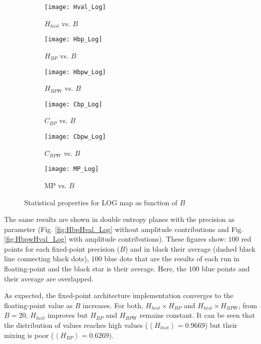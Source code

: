 \begin{figure}[htpb]
	\centering
	\begin{subfigure}[b]{0.49\textwidth}
		\texttt{[image: Hval\_Log]}
		\caption{$H_{hist}$ vs. $B$}
		\label{fig:Hval_Log}
	\end{subfigure}
	\begin{subfigure}[b]{0.49\textwidth}
		\texttt{[image: Hbp\_Log]}
		\caption{$H_{BP}$ vs. $B$}
		\label{fig:Hbp_Log}
	\end{subfigure}
	\begin{subfigure}[b]{0.49\textwidth}
		\texttt{[image: Hbpw\_Log]}
		\caption{$H_{BPW}$ vs. $B$}
		\label{fig:Hbpw_Log}
	\end{subfigure}
	\begin{subfigure}[b]{0.49\textwidth}
		\texttt{[image: Cbp\_Log]}
		\caption{$C_{BP}$ vs. $B$}
		\label{fig:Cbp_Log}
	\end{subfigure}
	\begin{subfigure}[b]{0.49\textwidth}
		\texttt{[image: Cbpw\_Log]}
		\caption{$C_{BPW}$ vs. $B$}
		\label{fig:Cbpw_Log}
	\end{subfigure}
	\begin{subfigure}[b]{0.49\textwidth}
		\texttt{[image: MP\_Log]}
		\caption{MP vs. $B$}
		\label{fig:MP_Log}
	\end{subfigure}
	\caption{Statistical properties for LOG map as function of $B$}
	\label{fig:LOG_QuantiB}
\end{figure}

The same results are shown in double entropy planes with the precision as parameter (Fig. \ref{fig:HbpHval_Log} without amplitude contributions and Fig. \ref{fig:HbpwHval_Log} with amplitude contributions).
These figures show: $100$ red points for each fixed-point precision ($B$) and in black their average (dashed black line connecting black dots), $100$ blue dots that are the results of each run in floating-point and the black star is their average.
Here, the $100$ blue points and their average are overlapped.

As expected, the fixed-point architecture implementation converges to the floating-point value as $B$ increases.
For both, $H_{hist} \times H_{BP}$ and $H_{hist} \times H_{BPW}$, from $B=20$, $H_{hist}$ improves but $H_{BP}$ and $H_{BPW}$ remains constant.
It can be seen that the distribution of values reaches high values ($\left\langle H_{hist}\right\rangle =0.9669$) but their mixing is poor ($\left\langle H_{BP}\right\rangle =0.6269$).

